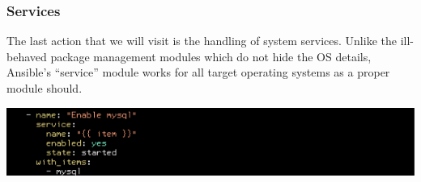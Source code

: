 \documentclass[helvetica,english,utf8,notitle,nologo]{beamer}
\begin{document}
\begin{frame}
  \frametitle{Services}

  The last action that we will visit is the handling of system
  services. Unlike the ill-behaved package management modules which do
  not hide the OS details, Ansible's ``service'' module works for all
  target operating systems as a proper module should.

  \includegraphics[scale=0.44]{img_25}
\end{frame}
\end{document}
